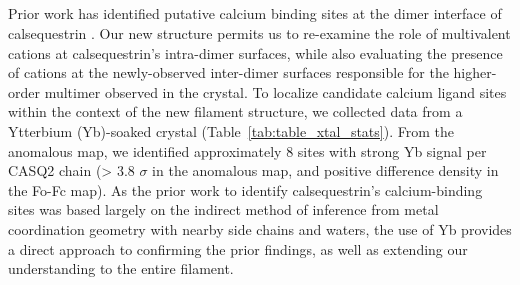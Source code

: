 \subsection{\headingsubsectionfourandfive}
% 
Prior work has identified putative calcium binding sites at the dimer interface of calsequestrin \cite{Sanchez2012-qi}. Our new structure permits us to re-examine the role of multivalent cations at calsequestrin's intra-dimer surfaces, while also evaluating the presence of cations at the newly-observed inter-dimer surfaces responsible for the higher-order multimer observed in the crystal. To localize candidate calcium ligand sites within the context of the new filament structure, we collected data from a Ytterbium (Yb)-soaked crystal (Table~\ref{tab:table_xtal_stats}). From the anomalous map, we identified approximately 8 sites with strong Yb signal per CASQ2 chain (> 3.8 $\sigma$ in the anomalous map, and positive difference density in the Fo-Fc map). As the prior work to identify calsequestrin's calcium-binding sites was based largely on the indirect method of inference from metal coordination geometry with nearby side chains and waters, the use of Yb provides a direct approach to confirming the prior findings, as well as extending our understanding to the entire filament. %

